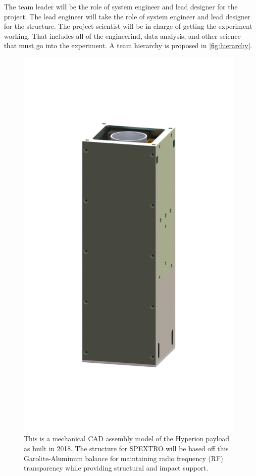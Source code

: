 \documentclass[conference]{IEEEtran} %
\begin{document}
The team leader will be the role of system engineer and lead designer for the project. The lead engineer will take the role of system engineer and lead designer for the structure.
The project scientist will be in charge of getting the experiment working. That includes all of the engineerind, data analysis, and other science that must go into the experiment.
A team hierarchy is proposed in \autoref{fig:hierarchy}.

\begin{figure}
  \includegraphics[width = \columnwidth]{figs/hyperion.png}
  \caption{This is a mechanical CAD assembly model of the Hyperion payload as built in 2018. The structure for SPEXTRO will be based off this Garolite-Aluminum balance for maintaining 
  radio frequency (RF) transparency while providing structural and impact support.}
  \label{fig:Hyperion}
\end{figure}
\end{document}
